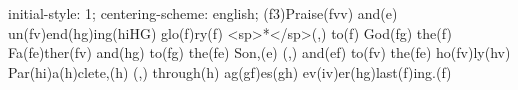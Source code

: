 initial-style: 1;
centering-scheme: english;
(f3)Praise(fvv) and(e) un(fv)end(hg)ing(hiHG) glo(f)ry(f) <sp>*</sp>(,) to(f) God(fg) the(f) Fa(fe)ther(fv) and(hg) to(fg) the(fe) Son,(e) (,) and(ef) to(fv) the(fe) ho(fv)ly(hv) Par(hi)a(h)clete,(h) (,) through(h) ag(gf)es(gh) ev(iv)er(hg)last(f)ing.(f)
